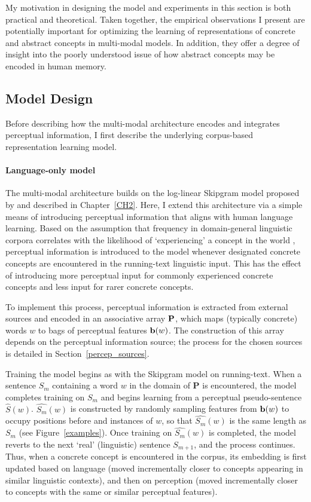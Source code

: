 My motivation in designing the model and experiments in this section is both practical and theoretical. Taken together, the empirical observations I present are potentially important for optimizing the learning of representations of concrete and abstract concepts in multi-modal models. In addition, they offer a degree of insight into the poorly understood issue of how abstract concepts may be encoded in human memory.    

\subsection{Model Design}

Before describing how the multi-modal architecture encodes and integrates perceptual information, I first describe the underlying corpus-based representation learning model. 

\paragraph{Language-only model} The multi-modal architecture builds on the log-linear Skipgram model proposed by \cite{mikolov2013efficient} and described in Chapter~\ref{CH2}. Here, I extend this architecture via a simple means of introducing perceptual information that aligns with human language learning. Based on the assumption that frequency in domain-general linguistic corpora correlates with the likelihood of `experiencing' a concept in the world \citep{bybee2001frequency,chater2006probabilistic}, perceptual information is introduced to the model whenever designated concrete concepts are encountered in the running-text linguistic input. This has the effect of introducing more perceptual input for commonly experienced concrete concepts and less input for rarer concrete concepts. 

To implement this process,  perceptual information is extracted from external sources and encoded in an associative array \(\bf{P}\), which maps (typically concrete) words \(w\) to bags of perceptual features \({\bf b}(w)\). The construction of this array depends on the perceptual information source; the process for the chosen sources is detailed in Section~\ref{percep_sources}.  

Training the model begins as with the Skipgram model on running-text. When a sentence \(S_m\) containing a word \(w\) in the domain of \(\mathbf{P}\) is encountered, the model completes training on \(S_m\) and begins learning from a perceptual pseudo-sentence \(\hat{S}(w)\).  \(\hat{S_m}(w)\) is constructed  by randomly sampling features from \({\bf b}(w)\) to occupy positions before and instances of \(w\), so that  \(\hat{S_m}(w)\) is the same length as \(S_m\) (see Figure~\ref{examples}). Once training on \(\hat{S_m}(w)\) is completed, the model reverts to the next `real' (linguistic) sentence \(S_{m+1}\), and the process continues. Thus, when a concrete concept is encountered in the corpus, its embedding is first updated based on language (moved incrementally closer to concepts appearing in similar linguistic contexts), and then on perception (moved incrementally closer to concepts with the same or similar perceptual features).  

